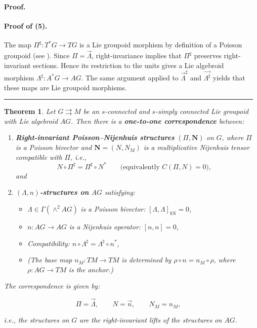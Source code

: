 \documentclass{article}
\newcommand{\SN}{\mathrm{SN}}
\newcommand{\II}{\Pi}
\newcommand{\NN}{\mathbf{N}}
\newcommand{\LL}{\Lambda}
\newtheorem{theorem}{Theorem}
\newenvironment{proof}[1][Proof]{\noindent\textbf{#1.} }{\ \rule{0.5em}{0.5em}}
\begin{document}
\begin{proof}
\paragraph{Proof of (5).}
The map $\II^{\sharp}: T^{*}G \to TG$ is a Lie groupoid morphism by definition of a Poisson groupoid (see \cite{Kiril0Mackenzie2}). Since $\II = \vec{\LL}$, right-invariance implies that $\II^{\sharp}$ preserves right-invariant sections. Hence its restriction to the units gives a Lie algebroid morphism $\LL^{\sharp}: A^{*}G \to AG$. The same argument applied to $\vec{\LL}^{\sharp}$ and $\overrightarrow{\LL^{\sharp}}$ 
yields that these maps are Lie groupoid morphisms.
\end{proof}

\vspace{1cm}


\begin{theorem}
\label{thm:correspondence}
Let $G \rightrightarrows M$ be an $s$-connected and $s$-simply connected Lie groupoid with Lie algebroid $AG$. Then there is a \textbf{one-to-one correspondence} between:

\begin{enumerate}
    \item \textbf{Right-invariant Poisson–Nijenhuis structures} $(\II, \NN)$ on $G$, where $\II$ is a Poisson bivector and $\NN = (N, N_M)$ is a multiplicative Nijenhuis tensor compatible with $\II$, i.e., 
    \[
    N \circ \II^{\sharp} = \II^{\sharp} \circ N^{*} \qquad \text{(equivalently } C(\II, N) = 0\text{)},
    \]
    and

    \item \textbf{$(\LL, n)$-structures on $AG$} satisfying:
    \begin{itemize}
        \item $\LL \in \Gamma(\wedge^2 AG)$ is a Poisson bivector: $[\LL, \LL]_{\SN} = 0$,
        \item $n: AG \to AG$ is a Nijenhuis operator: $[n, n] = 0$,
        \item Compatibility: $n \circ \LL^{\sharp} = \LL^{\sharp} \circ n^{*}$,
        \item (The base map $n_M: TM \to TM$ is determined by $\rho \circ n = n_M \circ \rho$, where $\rho: AG \to TM$ is the anchor.)
    \end{itemize}
\end{enumerate}

The correspondence is given by:

\[
\II = \overrightarrow{\LL}, \qquad N = \overrightarrow{n}, \qquad N_M = n_M,
\]

i.e., the structures on $G$ are the right-invariant lifts of the structures on $AG$.
\end{theorem}
\end{document}
